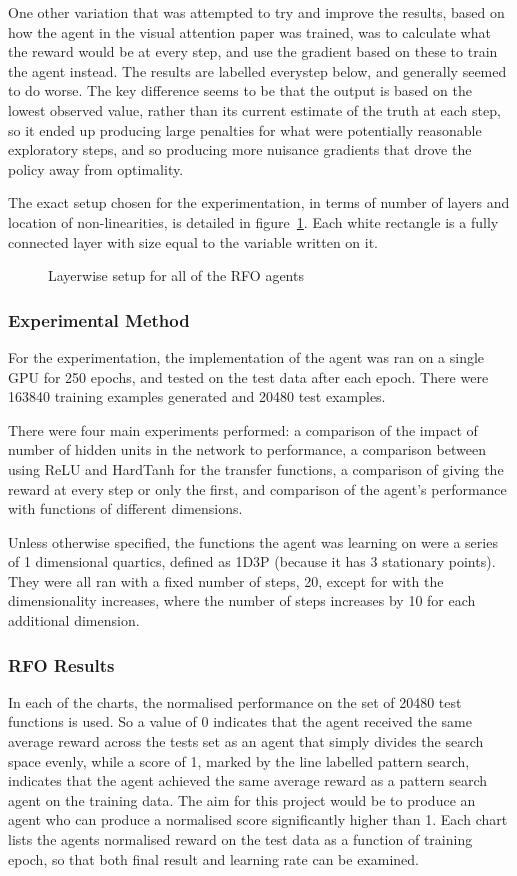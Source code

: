 One other variation that was attempted to try and improve the results, based on how the agent in the visual attention paper \cite{RVA} was trained, was to calculate what the reward would be at every step, and use the gradient based on these to train the agent instead. The results are labelled everystep below, and generally seemed to do worse. The key difference seems to be that the output is based on the lowest observed value, rather than its current estimate of the truth at each step, so it ended up producing large penalties for what were potentially reasonable exploratory steps, and so producing more nuisance gradients that drove the policy away from optimality.

The exact setup chosen for the experimentation, in terms of number of layers and location of non-linearities, is detailed in figure~\ref{fig:exactsetup}. Each white rectangle is a fully connected layer with size equal to the variable written on it. 
\begin{figure}
\centering

\caption{Layerwise setup for all of the RFO agents}
\label{fig:exactsetup}
\end{figure}

\subsubsection{Experimental Method}
For the experimentation, the implementation of the agent was ran on a single GPU for 250 epochs, and tested on the test data after each epoch. There were  163840 training examples generated and 20480 test examples. 

There were four main experiments performed: a comparison of the impact of number of hidden units in the network to performance, a comparison between using ReLU and HardTanh for the transfer functions, a comparison of giving the reward at every step or only the first, and comparison of the agent's performance with functions of different dimensions.

Unless otherwise specified, the functions the agent was learning on were a series of 1 dimensional quartics, defined as 1D3P (because it has 3 stationary points). They were all ran with a fixed number of steps, 20, except for with the dimensionality increases, where the number of steps increases by 10 for each additional dimension.

\subsubsection{RFO Results}
In each of the charts, the normalised performance on the set of 20480 test functions is used. So a value of 0 indicates that the agent received the same average reward across the tests set as an agent that simply divides the search space evenly, while a score of 1, marked by the line labelled pattern search, indicates that the agent achieved the same average reward as a pattern search agent on the training data. The aim for this project would be to produce an agent who can produce a normalised score significantly higher than 1. Each chart lists the agents  normalised reward on the test data as a function of training epoch, so that both final result and learning rate can be examined.


